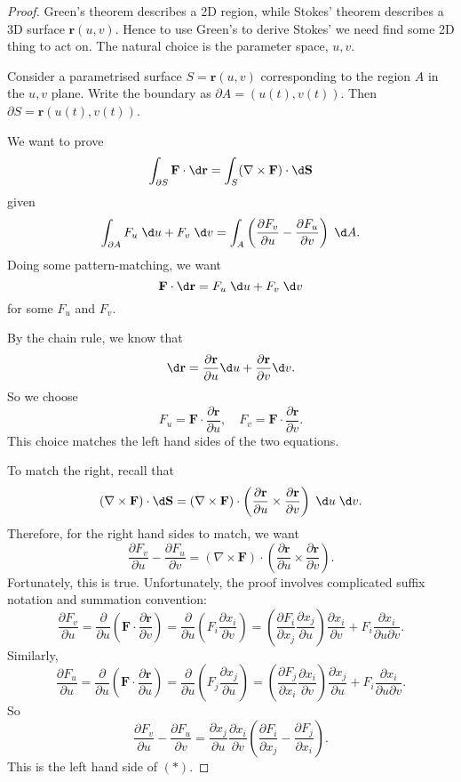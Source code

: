 \documentclass[a4paper]{article}
\begin{document}
\begin{proof}
  Green's theorem describes a 2D region, while Stokes' theorem describes a 3D surface $\mathbf{r}(u, v)$. Hence to use Green's to derive Stokes' we need find some 2D thing to act on. The natural choice is the parameter space, $u, v$.

  Consider a parametrised surface $S = \mathbf{r}(u, v)$ corresponding to the region $A$ in the $u, v$ plane. Write the boundary as $\partial A = (u(t), v(t))$. Then $\partial S = \mathbf{r}(u(t), v(t))$.

  We want to prove
  \[
    \int_{\partial S}\mathbf{F}\cdot \d \mathbf{r} = \int_S (\nabla \times \mathbf{F})\cdot \d \mathbf{S}
  \]
  given
  \[
    \int_{\partial A} F_u\;\d u + F_v\;\d v = \int_A\left(\frac{\partial F_v}{\partial u} - \frac{\partial F_u}{\partial v}\right)\;\d A.
  \]
  Doing some pattern-matching, we want
  \[
    \mathbf{F}\cdot \d \mathbf{r} = F_u \;\d u + F_v \;\d v
  \]
  for some $F_u$ and $F_v$.

  By the chain rule, we know that
  \[
    \d \mathbf{r} = \frac{\partial \mathbf{r}}{\partial u} \d u + \frac{\partial \mathbf{r}}{\partial v}\d v.
  \]
  So we choose
  \[
    F_u = \mathbf{F}\cdot \frac{\partial \mathbf{r}}{\partial u}, \quad F_v = \mathbf{F}\cdot\frac{\partial \mathbf{r}}{\partial v}.
  \]
  This choice matches the left hand sides of the two equations.

  To match the right, recall that
  \[
    (\nabla\times \mathbf{F}) \cdot \d \mathbf{S} = (\nabla\times \mathbf{F})\cdot \left(\frac{\partial \mathbf{r}}{\partial u}\times \frac{\partial \mathbf{r}}{\partial v}\right)\;\d u\;\d v.
  \]
  Therefore, for the right hand sides to match, we want
  \[
    \frac{\partial F_v}{\partial u} - \frac{\partial F_u}{\partial v} = (\nabla\times \mathbf{F})\cdot \left(\frac{\partial \mathbf{r}}{\partial u}\times \frac{\partial \mathbf{r}}{\partial v}\right).\tag{$*$}
  \]
  Fortunately, this is true. Unfortunately, the proof involves complicated suffix notation and summation convention:
  \[
    \frac{\partial F_v}{\partial u} = \frac{\partial}{\partial u}\left(\mathbf{F}\cdot \frac{\partial \mathbf{r}}{\partial v}\right) = \frac{\partial}{\partial u}\left(F_i\frac{\partial x_i}{\partial v}\right) = \left(\frac{\partial F_i}{\partial x_j}\frac{\partial x_j}{\partial u}\right)\frac{\partial x_i}{\partial v} + F_i\frac{\partial x_i}{\partial u\partial v}.
  \]
  Similarly,
  \[
    \frac{\partial F_u}{\partial u} = \frac{\partial}{\partial u}\left(\mathbf{F}\cdot \frac{\partial \mathbf{r}}{\partial u}\right) = \frac{\partial}{\partial u}\left(F_j\frac{\partial x_j}{\partial u}\right) = \left(\frac{\partial F_j}{\partial x_i}\frac{\partial x_i}{\partial v}\right)\frac{\partial x_j}{\partial u} + F_i\frac{\partial x_i}{\partial u\partial v}.
  \]
  So
  \[
    \frac{\partial F_v}{\partial u} - \frac{\partial F_u}{\partial v} = \frac{\partial x_j}{\partial u}\frac{\partial x_i}{\partial v}\left(\frac{\partial F_i}{\partial x_j} - \frac{\partial F_j}{\partial x_i}\right).
  \]
  This is the left hand side of $(*)$.


\end{proof}
\end{document}
